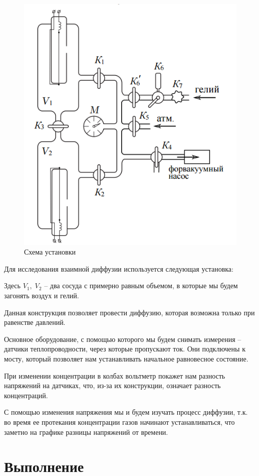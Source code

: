 \documentclass[a4paper,12pt]{article}
\theoremstyle{definition}
\begin{document}
	\begin{figure}
		\includegraphics[scale=0.8]{facility}				
		\caption{Схема установки}
		\label{facility}
	\end{figure}
	Для исследования взаимной диффузии используется следующая установка:
	
	Здесь $V_1,\; V_2$ -- два сосуда с примерно равным объемом, в которые мы будем загонять воздух и гелий.
	
	Данная конструкция позволяет провести диффузию, которая возможна только при равенстве давлений.
	
	Основное оборудование, с помощью которого мы будем снимать измерения -- датчики теплопроводности, через которые пропускают ток. Они подключены к мосту, который позволяет нам устанавливать начальное равновесное состояние.
	
	При изменении концентрации в колбах вольтметр покажет нам разность напряжений на датчиках, что, из-за их конструкции, означает разность концентраций. 
	
	С помощью изменения напряжения мы и будем изучать процесс диффузии, т.к. во время ее протекания концентрации газов начинают устанавливаться, что заметно на графике разницы напряжений от времени.
	
	\section{Выполнение}
		
\end{document}
